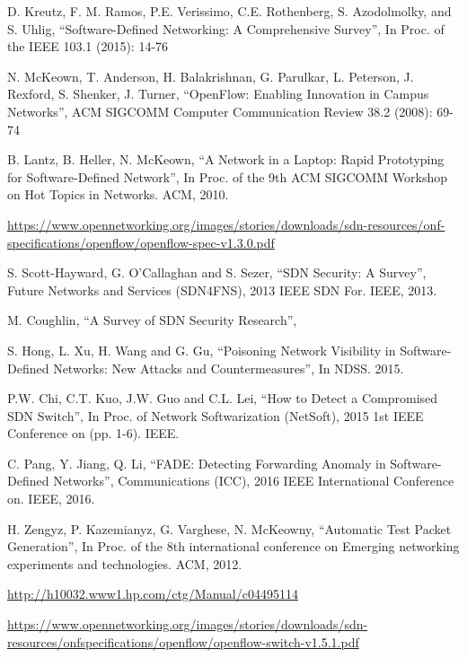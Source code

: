 \begin{thebibliography}{1}

D. Kreutz, F. M. Ramos, P.E. Verissimo, C.E. Rothenberg, S. Azodolmolky, and S. Uhlig,
``Software-Defined Networking: A Comprehensive Survey'', In Proc. of the IEEE 103.1 (2015): 14-76

N. McKeown, T. Anderson, H. Balakrishnan, G. Parulkar, L. Peterson, J. Rexford, S. Shenker, J. Turner,
``OpenFlow: Enabling Innovation in Campus Networks'', ACM SIGCOMM Computer Communication Review 38.2 (2008): 69-74

B. Lantz, B. Heller, N. McKeown,
``A Network in a Laptop: Rapid Prototyping for Software-Defined Network'', In Proc. of the 9th ACM SIGCOMM Workshop on Hot Topics in Networks. ACM, 2010.

\url{https://www.opennetworking.org/images/stories/downloads/sdn-resources/onf-specifications/openflow/openflow-spec-v1.3.0.pdf}

S. Scott-Hayward, G. O’Callaghan and S. Sezer,
``SDN Security: A Survey'', Future Networks and Services (SDN4FNS), 2013 IEEE SDN For. IEEE, 2013.

M. Coughlin,
``A Survey of SDN Security Research'',

S. Hong, L. Xu, H. Wang and G. Gu,
``Poisoning Network Visibility in Software-Defined Networks: New Attacks and Countermeasures'', In NDSS. 2015.

P.W. Chi, C.T. Kuo, J.W. Guo and C.L. Lei,
``How to Detect a Compromised SDN Switch'', In Proc. of Network Softwarization (NetSoft), 2015 1st IEEE Conference on (pp. 1-6). IEEE.

C. Pang, Y. Jiang, Q. Li,
``FADE: Detecting Forwarding Anomaly in Software-Defined Networks'', Communications (ICC), 2016 IEEE International Conference on. IEEE, 2016.

H. Zengyz, P. Kazemianyz, G. Varghese, N. McKeowny,
``Automatic Test Packet Generation'', In Proc. of the 8th international conference on Emerging networking experiments and technologies. ACM, 2012.

\url{http://h10032.www1.hp.com/ctg/Manual/c04495114}

\url{https://www.opennetworking.org/images/stories/downloads/sdn-resources/onfspecifications/openflow/openflow-switch-v1.5.1.pdf}


\end{thebibliography}
